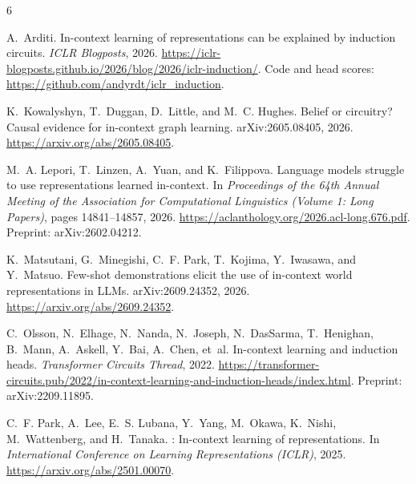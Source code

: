 \documentclass[11pt,a4paper]{article}
\begin{document}
\begin{thebibliography}{6}

A.~Arditi.
\newblock In-context learning of representations can be explained by induction circuits.
\newblock \emph{ICLR Blogposts}, 2026.
\newblock \url{https://iclr-blogposts.github.io/2026/blog/2026/iclr-induction/}.
\newblock Code and head scores: \url{https://github.com/andyrdt/iclr_induction}.

K.~Kowalyshyn, T.~Duggan, D.~Little, and M.~C. Hughes.
\newblock Belief or circuitry? {C}ausal evidence for in-context graph learning.
\newblock arXiv:2605.08405, 2026.
\newblock \url{https://arxiv.org/abs/2605.08405}.

M.~A. Lepori, T.~Linzen, A.~Yuan, and K.~Filippova.
\newblock Language models struggle to use representations learned in-context.
\newblock In \emph{Proceedings of the 64th Annual Meeting of the Association for Computational Linguistics (Volume 1:
Long Papers)}, pages 14841--14857, 2026.
\newblock \url{https://aclanthology.org/2026.acl-long.676.pdf}. Preprint: arXiv:2602.04212.

K.~Matsutani, G.~Minegishi, C.~F. Park, T.~Kojima, Y.~Iwasawa, and Y.~Matsuo.
\newblock Few-shot demonstrations elicit the use of in-context world representations in {LLMs}.
\newblock arXiv:2609.24352, 2026.
\newblock \url{https://arxiv.org/abs/2609.24352}.

C.~Olsson, N.~Elhage, N.~Nanda, N.~Joseph, N.~DasSarma, T.~Henighan, B.~Mann, A.~Askell, Y.~Bai, A.~Chen, et~al.
\newblock In-context learning and induction heads.
\newblock \emph{Transformer Circuits Thread}, 2022.
\newblock \url{https://transformer-circuits.pub/2022/in-context-learning-and-induction-heads/index.html}.
\newblock Preprint: arXiv:2209.11895.

C.~F. Park, A.~Lee, E.~S. Lubana, Y.~Yang, M.~Okawa, K.~Nishi, M.~Wattenberg, and H.~Tanaka.
: In-context learning of representations.
\newblock In \emph{International Conference on Learning Representations (ICLR)}, 2025.
\newblock \url{https://arxiv.org/abs/2501.00070}.

\end{thebibliography}
\end{document}
